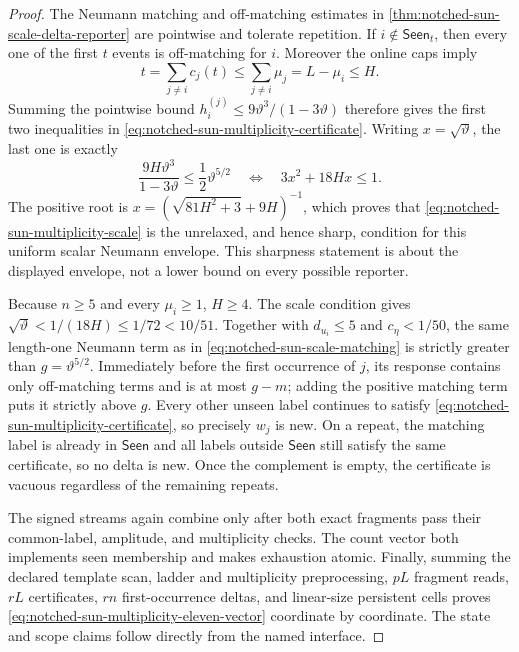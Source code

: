 \begin{proof}
The Neumann matching and off-matching estimates in
\cref{thm:notched-sun-scale-delta-reporter} are pointwise and tolerate
repetition.  If $i\notin\mathsf{Seen}_t$, then every one of the first $t$
events is off-matching for $i$.  Moreover the online caps imply
\begin{equation*}
 t=\sum_{j\ne i}c_j(t)
 \leq\sum_{j\ne i}\mu_j
 =L-\mu_i\leq H.
\end{equation*}
Summing the pointwise bound
$h_i^{(j)}\leq9\vartheta^3/(1-3\vartheta)$ therefore gives the first two
inequalities in
\cref{eq:notched-sun-multiplicity-certificate}.  Writing
$x=\sqrt\vartheta$, the last one is exactly
\begin{equation*}
 \frac{9H\vartheta^3}{1-3\vartheta}
 \leq\frac12\vartheta^{5/2}
 \quad\Longleftrightarrow\quad
 3x^2+18Hx\leq1.
\end{equation*}
The positive root is
$x=(\sqrt{81H^2+3}+9H)^{-1}$, which proves that
\cref{eq:notched-sun-multiplicity-scale} is the unrelaxed, and hence sharp,
condition for this uniform scalar Neumann envelope.  This sharpness statement
is about the displayed envelope, not a lower bound on every possible
reporter.

Because $n\geq5$ and every $\mu_i\geq1$, $H\geq4$.  The scale condition gives
$\sqrt\vartheta<1/(18H)\leq1/72<10/51$.  Together with $d_{u_i}\leq5$ and
$c_\eta<1/50$, the same length-one Neumann term as in
\cref{eq:notched-sun-scale-matching} is strictly greater than
$g=\vartheta^{5/2}$.  Immediately before the first occurrence of $j$, its
response contains only off-matching terms and is at most $g-m$; adding the
positive matching term puts it strictly above $g$.  Every other unseen label
continues to satisfy
\cref{eq:notched-sun-multiplicity-certificate}, so precisely $w_j$ is new.
On a repeat, the matching label is already in $\mathsf{Seen}$ and all labels
outside $\mathsf{Seen}$ still satisfy the same certificate, so no delta is
new.  Once the complement is empty, the certificate is vacuous regardless of
the remaining repeats.

The signed streams again combine only after both exact fragments pass their
common-label, amplitude, and multiplicity checks.  The count vector both
implements seen membership and makes exhaustion atomic.  Finally, summing
the declared template scan, ladder and multiplicity preprocessing, $pL$
fragment reads, $rL$ certificates, $rn$ first-occurrence deltas, and
linear-size persistent cells proves
\cref{eq:notched-sun-multiplicity-eleven-vector} coordinate by coordinate.
The state and scope claims follow directly from the named interface.
\end{proof}

